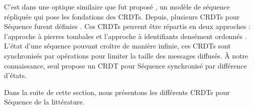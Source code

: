 C'est dans une optique similaire que fut proposé \cite{2006-woot-oster}, un modèle de séquence répliquée qui pose les fondations des \acp{CRDT}.
Depuis, plusieurs \acp{CRDT} pour Séquence furent définies \cite{ROH2011354, 2009-treedoc-preguica, 2009-logoot-weiss}.
Ces \acp{CRDT} peuvent être répartis en deux approches : l'approche à pierres tombales \cite{2006-woot-oster,ROH2011354} et l'approche à identifiants densément ordonnés \cite{2009-treedoc-preguica,2009-logoot-weiss}.
L'état d'une séquence pouvant croître de manière infinie, ces \acp{CRDT} sont synchronisés par opérations pour limiter la taille des messages diffusés.
À notre connaissance, seul \cite{2021-these-vic} propose un \ac{CRDT} pour Séquence synchronisé par différence d'états.

Dans la suite de cette section, nous présentons les différents \acp{CRDT} pour Séquence de la littérature.
